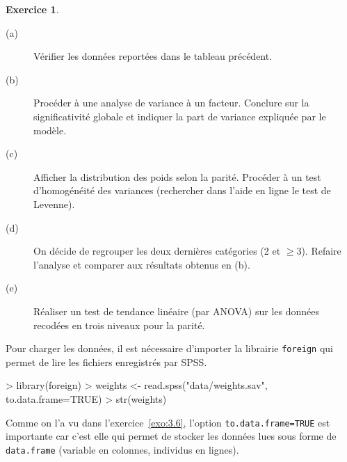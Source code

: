 \documentclass[11pt]{report}
\makeatletter
\theoremstyle{definition}
\newtheorem{exo}{Exercice}[chapter]
\newcommand{\foo}[1]{\texttt{#1}}
\newcommand{\cmd}[1]{\index{#1@\foo{#1}}}
\makeatother
\begin{document}
\begin{exo}
\begin{description}
\item[(a)] Vérifier les données reportées dans le tableau précédent.
\item[(b)] Procéder à une analyse de variance à un facteur. Conclure sur la
  significativité globale et indiquer la part de variance expliquée par le
  modèle.
\item[(c)] Afficher la distribution des poids selon la parité. Procéder à un
  test d'homogénéité des variances (rechercher dans l'aide en ligne le test
  de Levenne). 
\item[(d)] On décide de regrouper les deux dernières catégories (2 et $\ge
  3$). Refaire l'analyse et comparer aux résultats obtenus en (b).
\item[(e)] Réaliser un test de tendance linéaire (par ANOVA) sur les données
  recodées en trois niveaux pour la parité.
\end{description}
\begin{sol}
Pour charger les données, il est nécessaire d'importer la librairie
\texttt{foreign} qui permet de lire les fichiers enregistrés par SPSS.
\begin{Schunk}
\begin{Sinput}
> library(foreign)
> weights <- read.spss("data/weights.sav", to.data.frame=TRUE)
> str(weights)
\end{Sinput}
\end{Schunk}
\cmd{foreign}\cmd{read.spss}
Comme on l'a vu dans l'exercice~\ref{exo:3.6}, l'option
\verb|to.data.frame=TRUE| est importante car c'est elle qui permet de
stocker les données lues sous forme de \texttt{data.frame} (variable en
colonnes, individus en lignes).


\end{sol}
\end{exo}
\end{document}
